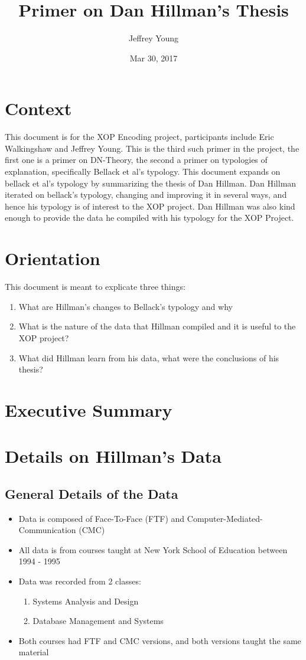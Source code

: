 \documentclass[10pt, letterpaper]{article}
\author{Jeffrey Young}
\date{Mar 30, 2017}
\title{Primer on Dan Hillman's Thesis}
\begin{document}
\maketitle

\section*{Context}
\label{sec:orgd6ba9af}
This document is for the XOP Encoding project, participants include Eric
Walkingshaw and Jeffrey Young. This is the third such primer in the project,
the first one is a primer on DN-Theory, the second a primer on typologies of
explanation, specifically Bellack et al's typology. This document expands on
bellack et al's typology by summarizing the thesis of Dan Hillman. Dan Hillman
iterated on bellack's typology, changing and improving it in several ways, and
hence his typology is of interest to the XOP project. Dan Hillman was also kind
enough to provide the data he compiled with his typology for the XOP Project.
\section*{Orientation}
\label{sec:orgd608119}
This document is meant to explicate three things:
\begin{enumerate}
\item What are Hillman's changes to Bellack's typology and why
\item What is the nature of the data that Hillman compiled and it is useful to the
XOP project?
\item What did Hillman learn from his data, what were the conclusions of his thesis?
\end{enumerate}
\section*{Executive Summary}
\label{sec:org71b0ef0}

\section*{Details on Hillman's Data}
\label{sec:org37b0e3f}

\subsection*{General Details of the Data}
\label{sec:org7ca9d3e}
\begin{itemize}
\item Data is composed of Face-To-Face (FTF) and Computer-Mediated-Communication
(CMC)
\item All data is from courses taught at New York School of Education between
1994 - 1995
\item Data was recorded from 2 classes:
\begin{enumerate}
\item Systems Analysis and Design
\item Database Management and Systems
\end{enumerate}
\item Both courses had FTF and CMC versions, and both versions taught the same material
\end{itemize}
\end{document}
